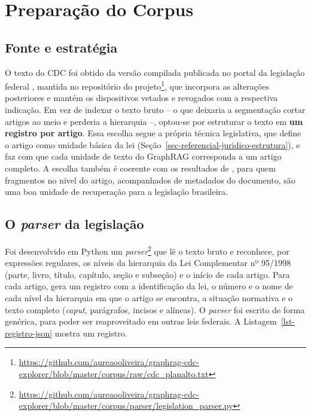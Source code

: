 \section{Preparação do Corpus}
\label{sec-indexacao-corpus}

\subsection{Fonte e estratégia}
\label{sec-indexacao-corpus-fonte}

O texto do CDC foi obtido da versão compilada publicada no portal da legislação federal \cite{brasil1990cdc}, mantida no repositório do projeto\footnote{\url{https://github.com/aureaooliveira/graphrag-cdc-explorer/blob/master/corpus/raw/cdc_planalto.txt}}, que incorpora as alterações posteriores e mantém os dispositivos vetados e revogados com a respectiva indicação. Em vez de indexar o texto bruto -- o que deixaria a segmentação cortar artigos ao meio e perderia a hierarquia --, optou-se por estruturar o texto em \textbf{um registro por artigo}. Essa escolha segue a própria técnica legislativa, que define o artigo como unidade básica da lei (Seção~\ref{sec-referencial-juridico-estrutura}), e faz com que cada unidade de texto do GraphRAG corresponda a um artigo completo. A escolha também é coerente com os resultados de , para quem fragmentos no nível do artigo, acompanhados de metadados do documento, são uma boa unidade de recuperação para a legislação brasileira.

\subsection{O \textit{parser} da legislação}
\label{sec-indexacao-corpus-parser}

Foi desenvolvido em Python um \textit{parser}\footnote{\url{https://github.com/aureaooliveira/graphrag-cdc-explorer/blob/master/corpus/parser/legislation_parser.py}} que lê o texto bruto e reconhece, por expressões regulares, os níveis da hierarquia da Lei Complementar nº 95/1998 \cite{brasil1998lc95} (parte, livro, título, capítulo, seção e subseção) e o início de cada artigo. Para cada artigo, gera um registro com a identificação da lei, o número e o nome de cada nível da hierarquia em que o artigo se encontra, a situação normativa e o texto completo (\textit{caput}, parágrafos, incisos e alíneas). O \textit{parser} foi escrito de forma genérica, para poder ser reaproveitado em outras leis federais. A Listagem~\ref{lst-registro-json} mostra um registro.

